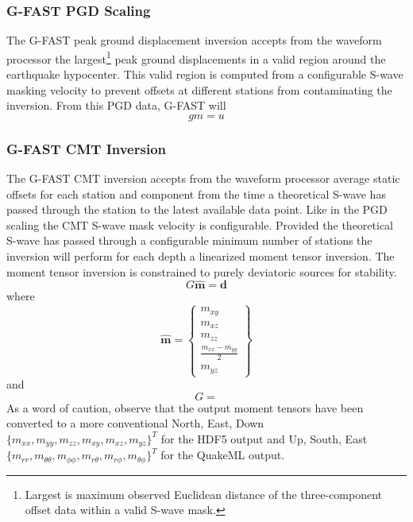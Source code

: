 \documentclass[12pt]{article}
\begin{document}
\subsubsection{G-FAST PGD Scaling}
The G-FAST peak ground displacement inversion accepts from the waveform processor the
largest\footnote{Largest is maximum observed Euclidean distance of the three-component offset 
data within a valid S-wave mask.} peak ground displacements in a valid region around the
earthquake hypocenter.  This valid region is computed from a configurable S-wave masking velocity to
prevent offsets at different stations from contaminating the inversion.  From this PGD data, 
G-FAST will 
\begin{equation}
 gm=u
\end{equation}

\subsubsection{G-FAST CMT Inversion}
The G-FAST CMT inversion accepts from the waveform processor average static offsets for each station
and component from the time a theoretical S-wave has passed through the station to the latest available
data point.  Like in the PGD scaling the CMT S-wave mask velocity is configurable.  Provided the
theoretical S-wave has passed through a configurable minimum number of stations the inversion will
perform for each depth a linearized moment tensor inversion.  The moment tensor inversion is 
constrained to purely deviatoric sources for stability.  
\begin{equation}
  G \hat{\textbf{m}} = \textbf{d}
\end{equation}
where 
\begin{equation}
   \hat{\textbf{m}} 
 = \left \{ 
     \begin{array}{c} 
       m_{xy} \\ m_{xz} \\ m_{zz} \\ \frac{m_{xx} - m_{yy}}{2} \\ m_{yz} 
     \end{array}
   \right \}
\end{equation}
and 
\begin{equation}
  G =
\end{equation}
As a word of caution, observe that the output moment tensors have been converted to a
more conventional North, East, Down \citep[e.g.][]{jostAndHerrmann} 
$\{m_{xx}, m_{yy}, m_{zz}, m_{xy}, m_{xz}, m_{yz}\}^T$ for the HDF5 output 
and Up, South, East
\citep[e.g.][]{globalCMT} 
$\{m_{rr}, m_{\theta \theta}, m_{\phi \phi}, m_{r \theta}, m_{r \phi}, m_{\theta \phi} \}^T$
for the QuakeML output.  
\end{document}
